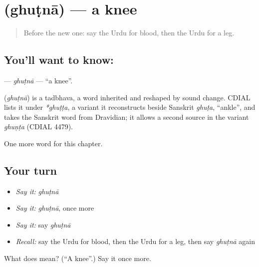 \section[\texorpdfstring{\ur{گھٹنا} (ghuṭnā)}{گھٹنا (ghuṭnā)}]{ (ghuṭnā) — a knee}

\label{lesson:UR-C40-ghutna}



\begin{quote}
Before the new one: say the Urdu for blood, then the Urdu for a leg.
\end{quote}

\subsection*{You'll want to know: }
\textbf{} — \emph{ghuṭnā} — \textquotedblleft{}a knee\textquotedblright{}.

\begin{cousinweb}
\textbf{} (\emph{ghuṭnā}) is a tadbhava, a word inherited and reshaped by sound change. CDIAL lists it under \emph{*ghuṭṭa}, a variant it reconstructs beside Sanskrit \emph{ghuṭa}, \textquotedblleft{}ankle\textquotedblright{}, and takes the Sanskrit word from Dravidian; it allows a second source in the variant \emph{ghuṇṭa} (CDIAL 4479).
\end{cousinweb}

\begin{grammarlens}[title={What you've built}]
One more word for this chapter.
\end{grammarlens}

\subsection*{Your turn}
\begin{itemize}
\raggedright
  \item \emph{Say it:} \emph{ghuṭnā}
  \item \emph{Say it:} \emph{ghuṭnā}, once more
  \item \emph{Say it:} say \emph{ghuṭnā}
  \item \emph{Recall:} say the Urdu for blood, then the Urdu for a leg, then say \emph{ghuṭnā} again
\end{itemize}

\begin{tcolorbox}[breakable,colback=teal!4,colframe=teal!35!black,title={Before you move on}]
What does  mean? (\textquotedblleft{}A knee\textquotedblright{}.) Say it once more.
\end{tcolorbox}
